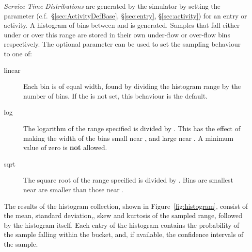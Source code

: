 \emph{Service Time Distributions} are generated by the simulator by
setting the  parameter (c.f.~\S\ref{sec:ActivityDefBase},
\S\ref{sec:entry}, \S\ref{sec:activity}) for an entry or activity.  A histogram of 
bins between  and  is generated.  Samples that fall either under or over this
range are stored in their own under-flow or over-flow
bins respectively.  The optional  parameter can be used to set the sampling behaviour
to one of:
\begin{description}
\item[linear] Each bin is of equal width, found by dividing the histogram range by the number of bins.  If
  the  is not set, this behaviour is the default.
\item[log] The logarithm of the range specified is divided by .  This has the effect
  of making the width of the bins small near , and large near .  A minimum
  value of zero is \textbf{not} allowed.
\item[sqrt] The square root of the range specified is divided by .  Bins are smallest
  near  are smaller than those near .
\end{description}

The results of the histogram collection, shown in Figure~\ref{fig:histogram}, consist of the
mean, standard deviation,,
skew and kurtosis of the sampled range, followed by
the histogram itself.  Each entry of the histogram contains the probability of the sample falling within the
bucket, and, if available, the confidence intervals of the sample.


